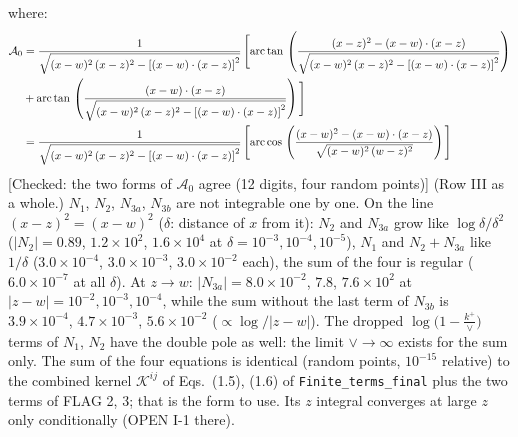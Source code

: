 \documentclass[9pt]{article}
\numberwithin{equation}{section}
\begin{document}
where: \begin{align}
\mathcal{A}_{0} & = \frac{1}{\sqrt{(x-w)^{2}\,(x-z)^{2}-\left[(x-w)\cdot (x-z)\right]^{2}}}\, \Bigg[\mathrm{arc\,tan}\,\left(\frac{(x-z)^{2}-(x-w)\cdot (x-z)}{\sqrt{(x-w)^{2}\,(x-z)^{2}-\left[(x-w)\cdot (x-z)\right]^{2}}}\right)\notag \\ & + \mathrm{arc\,tan}\,\left(\frac{(x-w)\cdot (x-z)}{\sqrt{(x-w)^{2}\,(x-z)^{2}-\left[(x-w)\cdot (x-z)\right]^{2}}}\right) \Bigg]\notag \\ & = \frac{1}{\sqrt{(x-w)^{2}\,(x-z)^{2}-\left[(x-w)\cdot (x-z)\right]^{2}}}\, \Bigg[\mathrm{arc\,cos}\,\left(\frac{(x-w)^{2}-(x-w)\cdot (x-z)}{\sqrt{(x-w)^{2}\,(w-z)^{2}}}\right)\Bigg]
\end{align} {\color{red}[Checked: the two forms of $\mathcal{A}_{0}$ agree (12 digits, four random points)]} {\color{magenta} (Row III as a whole.) $N_{1}$, $N_{2}$, $N_{3a}$, $N_{3b}$ are not integrable one by one. On the line $(x-z)^{2}=(x-w)^{2}$ ($\delta$: distance of $x$ from it): $N_{2}$ and $N_{3a}$ grow like $\log\delta/\delta^{2}$ ($|N_{2}|=0.89$, $1.2\times10^{2}$, $1.6\times10^{4}$ at $\delta=10^{-3},10^{-4},10^{-5}$), $N_{1}$ and $N_{2}+N_{3a}$ like $1/\delta$ ($3.0\times10^{-4}$, $3.0\times10^{-3}$, $3.0\times10^{-2}$ each), the sum of the four is regular ($6.0\times10^{-7}$ at all $\delta$). At $z\to w$: $|N_{3a}|=8.0\times10^{-2}$, $7.8$, $7.6\times10^{2}$ at $|z-w|=10^{-2},10^{-3},10^{-4}$, while the sum without the last term of $N_{3b}$ is $3.9\times10^{-4}$, $4.7\times10^{-3}$, $5.6\times10^{-2}$ ($\propto\log/|z-w|$). The dropped $\log\big(1-\frac{k^{+}}{\vee}\big)$ terms of $N_{1}$, $N_{2}$ have the double pole as well: the limit $\vee\to\infty$ exists for the sum only. The sum of the four equations is identical (random points, $10^{-15}$ relative) to the combined kernel $\mathcal{K}^{ij}$ of Eqs.~(1.5), (1.6) of \texttt{Finite\_terms\_final} plus the two terms of FLAG 2, 3; that is the form to use. Its $z$ integral converges at large $z$ only conditionally (OPEN I-1 there).}\par\noindent
\end{document}
